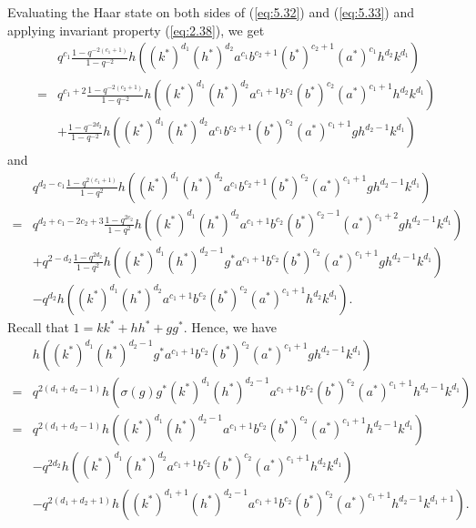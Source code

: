 \documentclass[table,a4paper,reqno]{amsart}
\numberwithin{equation}{section}
\theoremstyle{definition}
\begin{document}
Evaluating the Haar state on both sides of (\ref{eq:5.32}) and (\ref{eq:5.33}) and applying invariant property (\ref{eq:2.38}), we get
\begin{equation}\label{eq:5.34}
    \begin{split}
        &q^{c_1}\frac{1-q^{-2(c_1+1)}}{1-q^{-2}}h\left((k^*)^{d_1}(h^*)^{d_2}a^{c_1}b^{c_2+1}(b^*)^{c_2+1}(a^*)^{c_1}h^{d_2}k^{d_1}\right)\\
        =&q^{c_1+2}\frac{1-q^{-2(c_2+1)}}{1-q^{-2}}h\left((k^*)^{d_1}(h^*)^{d_2}a^{c_1+1}b^{c_2}(b^*)^{c_2}(a^*)^{c_1+1}h^{d_2}k^{d_1}\right)\\
        &+\frac{1-q^{-2d_2}}{1-q^{-2}}h\left((k^*)^{d_1}(h^*)^{d_2}a^{c_1}b^{c_2+1}(b^*)^{c_2}(a^*)^{c_1+1}gh^{d_2-1}k^{d_1}\right)
    \end{split}
\end{equation}
and
\begin{equation}\label{eq:5.35}
    \begin{split}
        &q^{d_2-c_1}\frac{1-q^{2(c_1+1)}}{1-q^2}h\left((k^*)^{d_1}(h^*)^{d_2}a^{c_1}b^{c_2+1}(b^*)^{c_2}(a^*)^{c_1+1}gh^{d_2-1}k^{d_1}\right)\\
        =&q^{d_2+c_1-2c_2+3}\frac{1-q^{2c_2}}{1-q^2}h\left((k^*)^{d_1}(h^*)^{d_2}a^{c_1+1}b^{c_2}(b^*)^{c_2-1}(a^*)^{c_1+2}gh^{d_2-1}k^{d_1}\right)\\
        &+q^{2-d_2}\frac{1-q^{2d_2}}{1-q^2}h\left((k^*)^{d_1}(h^*)^{d_2-1}g^*a^{c_1+1}b^{c_2}(b^*)^{c_2}(a^*)^{c_1+1}gh^{d_2-1}k^{d_1}\right)\\
        &-q^{d_2}h\left((k^*)^{d_1}(h^*)^{d_2}a^{c_1+1}b^{c_2}(b^*)^{c_2}(a^*)^{c_1+1}h^{d_2}k^{d_1}\right).
    \end{split}
\end{equation}
Recall that $1=kk^*+hh^*+gg^*$. Hence, we have
\begin{equation}\label{eq:5.36}
    \begin{split}
        &h\left((k^*)^{d_1}(h^*)^{d_2-1}g^*a^{c_1+1}b^{c_2}(b^*)^{c_2}(a^*)^{c_1+1}gh^{d_2-1}k^{d_1}\right)\\
        =&q^{2(d_1+d_2-1)}h\left(\sigma(g)g^*(k^*)^{d_1}(h^*)^{d_2-1}a^{c_1+1}b^{c_2}(b^*)^{c_2}(a^*)^{c_1+1}h^{d_2-1}k^{d_1}\right)\\
        =&q^{2(d_1+d_2-1)}h\left((k^*)^{d_1}(h^*)^{d_2-1}a^{c_1+1}b^{c_2}(b^*)^{c_2}(a^*)^{c_1+1}h^{d_2-1}k^{d_1}\right)\\
        &-q^{2d_2}h\left((k^*)^{d_1}(h^*)^{d_2}a^{c_1+1}b^{c_2}(b^*)^{c_2}(a^*)^{c_1+1}h^{d_2}k^{d_1}\right)\\
        &-q^{2(d_1+d_2+1)}h\left((k^*)^{d_1+1}(h^*)^{d_2-1}a^{c_1+1}b^{c_2}(b^*)^{c_2}(a^*)^{c_1+1}h^{d_2-1}k^{d_1+1}\right).
    \end{split}
\end{equation}
\end{document}
